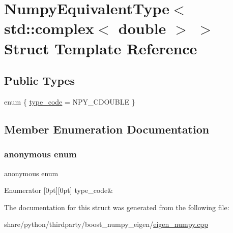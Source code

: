 \hypertarget{structNumpyEquivalentType_3_01std_1_1complex_3_01double_01_4_01_4}{}\section{Numpy\+Equivalent\+Type$<$ std\+:\+:complex$<$ double $>$ $>$ Struct Template Reference}
\label{structNumpyEquivalentType_3_01std_1_1complex_3_01double_01_4_01_4}
\subsection*{Public Types}
\begin{DoxyCompactItemize}
\item 
enum \{ \hyperlink{structNumpyEquivalentType_3_01std_1_1complex_3_01double_01_4_01_4_ad30cc05aab8610a8b8c3e3aeca94a6daa360c19b56b916a5226bed235adead4d2}{type\+\_\+code} = N\+P\+Y\+\_\+\+C\+D\+O\+U\+B\+LE
 \}
\end{DoxyCompactItemize}


\subsection{Member Enumeration Documentation}
\mbox{\label{structNumpyEquivalentType_3_01std_1_1complex_3_01double_01_4_01_4_ad30cc05aab8610a8b8c3e3aeca94a6da}} 
\subsubsection{\texorpdfstring{anonymous enum}{anonymous enum}}
{\footnotesize\ttfamily anonymous enum}

\begin{DoxyEnumFields}{Enumerator}
[0pt][0pt]{}\mbox{\label{structNumpyEquivalentType_3_01std_1_1complex_3_01double_01_4_01_4_ad30cc05aab8610a8b8c3e3aeca94a6daa360c19b56b916a5226bed235adead4d2}} 
type\+\_\+code&\\
\hline

\end{DoxyEnumFields}


The documentation for this struct was generated from the following file\+:\begin{DoxyCompactItemize}
\item 
share/python/thirdparty/boost\+\_\+numpy\+\_\+eigen/\hyperlink{eigen__numpy_8cpp}{eigen\+\_\+numpy.\+cpp}\end{DoxyCompactItemize}
